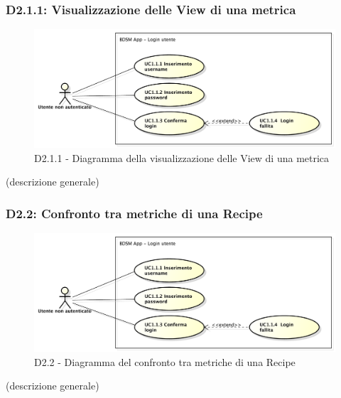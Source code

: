 		\subsubsection{D2.1.1: Visualizzazione delle View di una metrica} %
		\label{ssub:visualizzazione_view_di_una_metrica}
		\begin{figure}[!htbp]
			\centering
			\centerline{\includegraphics[scale=0.45]{./images/UC1_1.pdf}}
			\caption{D2.1.1 - Diagramma della visualizzazione delle View di una metrica}
		\end{figure}
		\noindent
		[TO DO] (descrizione generale)

		\subsubsection{D2.2: Confronto tra metriche di una Recipe} %
		\label{ssub:confronto_tra_metriche_di_una_recipe}
		\begin{figure}[!htbp]
			\centering
			\centerline{\includegraphics[scale=0.45]{./images/UC1_1.pdf}}
			\caption{D2.2 - Diagramma del confronto tra metriche di una Recipe}
		\end{figure}
		\noindent
		[TO DO] (descrizione generale)

